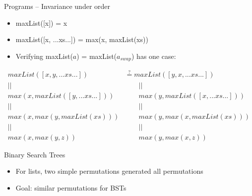\documentclass[usenames,dvipsnames]{beamer}
\begin{document}
\begin{frame}[fragile]{Programs -- Invariance under order}
  \begin{itemize}
    \item maxList([x]) = x
    \item maxList([x, ...xs...]) = max(x, maxList(xs))
  \end{itemize}
  \begin{itemize}
    \item Verifying maxList($a$) = maxList($a_{swap}$) has one case:
  \end{itemize}
  \begin{align*}
    maxList([x, y, ...xs...])
      & \stackrel{?}{=}
    maxList([y, x, ...xs...])
    \\ || \qquad & \qquad || \\
    max(x, maxList([y, ...xs...]))
      & \qquad
    max(y, maxList([x, ...xs...]))
    \\ || \qquad & \qquad || \\
    max(x, max(y, maxList(xs)))
      & \qquad
    max(y, max(x, maxList(xs)))
    \\ || \qquad & \qquad || \\
    max(x, max(y, z))
      & \qquad
    max(y, max(x, z))
  \end{align*}
\end{frame}

\begin{frame}[fragile]{Binary Search Trees}
  \begin{itemize}
    \item For lists, two simple permutations generated all permutations
    \item Goal: similar permutations for BSTs
  \end{itemize}
\end{frame}
\end{document}
